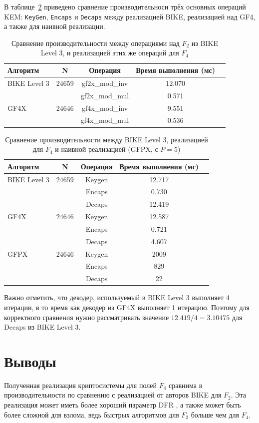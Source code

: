 \documentclass[14pt]{mmcs_article}
\theoremstyle{break}
\begin{document}
В таблице~\ref{tab:perf} приведено сравнение производительноси трёх основных операций KEM: \texttt{KeyGen}, \texttt{Encaps} и \texttt{Decaps} между реализацией BIKE, реализацией над GF4, а также для наивной реализации.

\begin{table}[ht]
\centering
    \caption{Сравнение производительности между операциями над $F_2$ из BIKE Level 3, и реализацией этих же операций для $F_4$}
\label{tab:perf_gfx}
\begin{tabular}{lcccc}
\hline
Алгоритм & N & Операция & Время выполнения (мс) \\
\hline
BIKE Level 3 & 24659 & gf2x\_mod\_inv & 12.070 \\
             &       & gf2x\_mod\_mul & 0.571  \\
\hline
GF4X         & 24646 & gf4x\_mod\_inv & 9.551 \\
             &       & gf4x\_mod\_mul & 0.536  \\
\hline
\end{tabular}
\end{table}

\begin{table}[ht]
\centering
    \caption{Сравнение производительности между BIKE Level 3, реализацией для $F_4$ и наивной реализацией (GFPX, с $P = 5$)}
\label{tab:perf}
\begin{tabular}{lcccc}
\hline
Алгоритм & N & Операция & Время выполнения (мс) \\
\hline
BIKE Level 3 & 24659 & Keygen & 12.717 \\
             &       & Encaps & 0.730  \\
             &       & Decaps & 12.419 \\
\hline
GF4X         & 24646 & Keygen  & 12.587 \\
             &       & Encaps  & 0.721  \\
             &       & Decaps  & 4.607  \\
\hline
GFPX         & 24646 & Keygen  & 2009   \\
             &       & Encaps  & 829    \\
             &       & Decaps  & 22     \\
\hline
\end{tabular}
\end{table}

Важно отметить, что декодер, используемый в BIKE Level 3 выполняет 4 итерации, в то время как декодер из GF4X выполняет 1 итерацию. Поэтому для корректного сравнения нужно рассматривать значение $12.419 / 4 = 3.10475$ для Decaps из BIKE Level 3.

\section{Выводы}
\label{sec8}

Полученная реализация криптосистемы для полей $F_4$ сравнима в производительности по сравнению с реализацией от авторов BIKE для $F_2$. Эта реализация может иметь более хороший параметр DFR \cite{vedenev-paper}, а также может быть более сложной для взлома, ведь быстрых алгоритмов для $F_2$ больше чем для $F_4$.

\printbibliography
\end{document}
